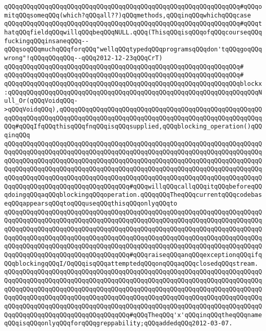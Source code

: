 \verb|qQQqqQQqqQQqqQQqqQQqqQQqqQQqqQQqqQQqqQQqqQQqqQQqqQQqqQQqqQQqqQQq#qQQqomitqQQqsomeqQQq(which?qQQqall??)qQQqmethods,qQQqinqQQqwhichqQQqcase|\newline
\verb|qQQqqQQqqQQqqQQqqQQqqQQqqQQqqQQqqQQqqQQqqQQqqQQqqQQqqQQqqQQqqQQq#qQQqthatqQQqfieldqQQqwillqQQqbeqQQqNULL.qQQq(ThisqQQqisqQQqofqQQqcourseqQQqfuckingqQQqinsaneqQQq--qQQqsoqQQqmuchqQQqforqQQq"wellqQQqtypedqQQqprogramsqQQqdon'tqQQqgoqQQqwrong"!qQQqqQQqqQQq--qQQq2012-12-23qQQqCrT)|\newline
\verb|qQQqqQQqqQQqqQQqqQQqqQQqqQQqqQQqqQQqqQQqqQQqqQQqqQQqqQQqqQQqqQQq#|\newline
\verb|qQQqqQQqqQQqqQQqqQQqqQQqqQQqqQQqqQQqqQQqqQQqqQQqqQQqqQQqqQQqqQQq#|\newline
\verb|qQQqqQQqqQQqqQQqqQQqqQQqqQQqqQQqqQQqqQQqqQQqqQQqqQQqqQQqqQQqqQQqblockx:qQQqqQQqqQQqqQQqqQQqqQQqqQQqqQQqqQQqqQQqqQQqqQQqqQQqqQQqqQQqqQQqqQQqNull_Or(qQQqVoidqQQq->qQQqVoidqQQq),qQQqqQQqqQQqqQQqqQQqqQQqqQQqqQQqqQQqqQQqqQQqqQQqqQQqqQQqqQQqqQQqqQQqqQQqqQQqqQQqqQQqqQQqqQQqqQQqqQQqqQQqqQQqqQQqqQQqqQQqqQQqqQQq#qQQqIfqQQqthisqQQqfnqQQqisqQQqsupplied,qQQqblocking_operation()qQQqinqQQq|\newline
\verb|qQQqqQQqqQQqqQQqqQQqqQQqqQQqqQQqqQQqqQQqqQQqqQQqqQQqqQQqqQQqqQQqqQQqqQQqqQQqqQQqqQQqqQQqqQQqqQQqqQQqqQQqqQQqqQQqqQQqqQQqqQQqqQQqqQQqqQQqqQQqqQQqqQQqqQQqqQQqqQQqqQQqqQQqqQQqqQQqqQQqqQQqqQQqqQQqqQQqqQQqqQQqqQQqqQQqqQQqqQQqqQQqqQQqqQQqqQQqqQQqqQQqqQQqqQQqqQQqqQQqqQQqqQQqqQQqqQQqqQQqqQQqqQQqqQQqqQQqqQQqqQQqqQQqqQQqqQQqqQQqqQQqqQQqqQQqqQQqqQQqqQQqqQQqqQQqqQQqqQQqqQQqqQQqqQQqqQQqqQQqqQQq#qQQqwillqQQqcallqQQqitqQQqbeforeqQQqdoingqQQqaqQQqblockingqQQqoperation.qQQqqQQqTheqQQqcurrentqQQqcodebaseqQQqappearsqQQqtoqQQquseqQQqthisqQQqonlyqQQqto|\newline
\verb|qQQqqQQqqQQqqQQqqQQqqQQqqQQqqQQqqQQqqQQqqQQqqQQqqQQqqQQqqQQqqQQqqQQqqQQqqQQqqQQqqQQqqQQqqQQqqQQqqQQqqQQqqQQqqQQqqQQqqQQqqQQqqQQqqQQqqQQqqQQqqQQqqQQqqQQqqQQqqQQqqQQqqQQqqQQqqQQqqQQqqQQqqQQqqQQqqQQqqQQqqQQqqQQqqQQqqQQqqQQqqQQqqQQqqQQqqQQqqQQqqQQqqQQqqQQqqQQqqQQqqQQqqQQqqQQqqQQqqQQqqQQqqQQqqQQqqQQqqQQqqQQqqQQqqQQqqQQqqQQqqQQqqQQqqQQqqQQqqQQqqQQqqQQqqQQqqQQqqQQqqQQqqQQqqQQqqQQqqQQqqQQq#qQQqraiseqQQqanqQQqexceptionqQQqifqQQqblockingqQQqI/OqQQqisqQQqattemptedqQQqonqQQqaqQQqclosedqQQqstream.|\newline
\verb|qQQqqQQqqQQqqQQqqQQqqQQqqQQqqQQqqQQqqQQqqQQqqQQqqQQqqQQqqQQqqQQqqQQqqQQqqQQqqQQqqQQqqQQqqQQqqQQqqQQqqQQqqQQqqQQqqQQqqQQqqQQqqQQqqQQqqQQqqQQqqQQqqQQqqQQqqQQqqQQqqQQqqQQqqQQqqQQqqQQqqQQqqQQqqQQqqQQqqQQqqQQqqQQqqQQqqQQqqQQqqQQqqQQqqQQqqQQqqQQqqQQqqQQqqQQqqQQqqQQqqQQqqQQqqQQqqQQqqQQqqQQqqQQqqQQqqQQqqQQqqQQqqQQqqQQqqQQqqQQqqQQqqQQqqQQqqQQqqQQqqQQqqQQqqQQqqQQqqQQqqQQqqQQqqQQqqQQqqQQqqQQq#qQQqTheqQQq'x'qQQqinqQQqtheqQQqnameqQQqisqQQqonlyqQQqforqQQqgreppability;qQQqaddedqQQq2012-03-07.|\newline
